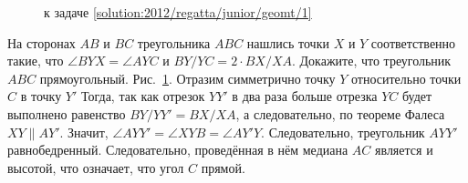 \ifsolution
\begin{figure}\centering
    \caption{к задаче \ref{solution:2012/regatta/junior/geomt/1}}
    \label{fig:solution:2012/regatta/junior/geomt/1}
\end{figure}
\fi %

\problem
На сторонах $AB$ и $BC$ треугольника $ABC$ нашлись точки $X$ и $Y$
соответственно такие, что
$\angle BYX = \angle AYC$ и $BY / YC = 2 \cdot BX / XA$.
Докажите, что треугольник $ABC$ прямоугольный.
\solution
\label{solution:2012/regatta/junior/geomt/1}%
Рис.~\ref{fig:solution:2012/regatta/junior/geomt/1}.
Отразим симметрично точку $Y$ относительно точки $C$ в точку $Y'$
Тогда, так как отрезок $YY'$ в два раза больше отрезка $YC$ будет выполнено
равенство $BY / YY' = BX / XA$, а следовательно, по теореме
Фалеса $XY \parallel AY'$.
Значит, $\angle AYY' = \angle XYB = \angle AY'Y$.
Следовательно, треугольник $AYY'$ равнобедренный.
Следовательно, проведённая в нём медиана $AC$ является и высотой,
что означает, что угол $C$ прямой.
\endproblem
